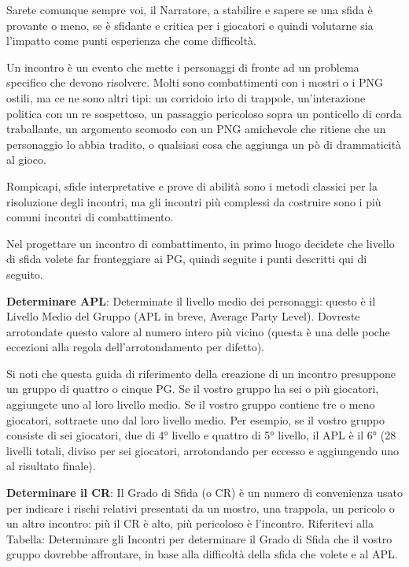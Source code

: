 \documentclass[a4paper,11pt,twoside,openany]{book}
\begin{document}
Sarete comunque sempre voi, il Narratore, a stabilire e sapere se una sfida è provante o meno, se è sfidante e critica per i giocatori e quindi volutarne sia l'impatto come punti esperienza che come difficoltà.

Un incontro è un evento che mette i personaggi di fronte ad un problema specifico che devono risolvere. Molti sono combattimenti con i mostri o i PNG ostili, ma ce ne sono altri tipi: un corridoio irto di trappole, un'interazione politica con un re sospettoso, un passaggio pericoloso sopra un ponticello di corda traballante, un argomento scomodo con un PNG amichevole che ritiene che un personaggio lo abbia tradito, o qualsiasi cosa che aggiunga un pò di drammaticità al gioco.

Rompicapi, sfide interpretative e prove di abilità sono i metodi classici per la risoluzione degli incontri, ma gli incontri più complessi da costruire sono i più comuni incontri di combattimento.

Nel progettare un incontro di combattimento, in primo luogo decidete che livello di sfida volete far fronteggiare ai PG, quindi seguite i punti descritti qui di seguito.

\textbf{Determinare APL}: Determinate il livello medio dei personaggi: questo è il Livello Medio del Gruppo (APL in breve, Average Party Level). Dovreste arrotondate questo valore al numero intero più vicino (questa è una delle poche eccezioni alla regola dell'arrotondamento per difetto).

Si noti che questa guida di riferimento della creazione di un incontro presuppone un gruppo di quattro o cinque PG. Se il vostro gruppo ha sei o più giocatori, aggiungete uno al loro livello medio. Se il vostro gruppo contiene tre o meno giocatori, sottraete uno dal loro livello medio. Per esempio, se il vostro gruppo consiste di sei giocatori, due di 4° livello e quattro di 5° livello, il APL è il 6° (28 livelli totali, diviso per sei giocatori, arrotondando per eccesso e aggiungendo uno al risultato finale).

\textbf{Determinare il CR}: Il Grado di Sfida (o CR) è un numero di convenienza usato per indicare i rischi relativi presentati da un mostro, una trappola, un pericolo o un altro incontro: più il CR è alto, più pericoloso è l'incontro. Riferitevi alla Tabella: Determinare gli Incontri per determinare il Grado di Sfida che il vostro gruppo dovrebbe affrontare, in base alla difficoltà della sfida che volete e al APL.

\bigskip
\end{document}

